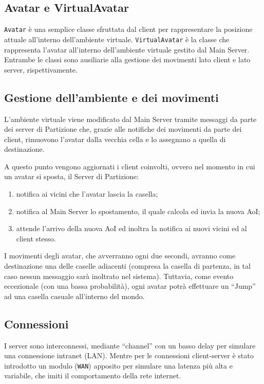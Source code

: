 \documentclass[a4paper, 11pt, oneside]{book}
\theoremstyle{definition}
\theoremstyle{remark}
\begin{document}
\subsection{Avatar e VirtualAvatar}
\texttt{Avatar} è una semplice classe sfruttata dal client per rappresentare
la posizione attuale all'interno dell'ambiente virtuale.
\texttt{VirtualAvatar} è la classe che rappresenta l'avatar all'interno
dell'ambiente virtuale gestito dal Main Server. Entrambe le classi sono
ausiliarie alla gestione dei movimenti lato client e lato server,
rispettivamente.


\subsection{Gestione dell'ambiente e dei movimenti}
L'ambiente virtuale viene modificato dal Main Server tramite messaggi da parte
dei server di Partizione che, grazie alle notifiche dei
movimenti da parte dei client, rimuovono l'avatar dalla vecchia cella
e lo assegnano a quella di destinazione.

A questo punto vengono aggiornati i client coinvolti, ovvero nel momento
in cui un avatar si sposta, il Server di Partizione:
\begin{enumerate}
\item
notifica ai vicini che l'avatar lascia la casella;
\item
notifica al Main Server lo spostamento, il quale calcola ed invia la nuova
AoI;
\item
attende l'arrivo della nuova AoI ed inoltra la notifica ai nuovi vicini ed al
client stesso.
\end{enumerate}

I movimenti degli avatar, che avverranno ogni due secondi, avranno come
destinazione una delle caselle adiacenti (compresa la casella di partenza,
in tal caso nessun messaggio sarà inoltrato nel sistema). Tuttavia,
come evento eccezionale (con una bassa probabilità), ogni avatar potrà
effettuare un ``Jump'' ad una casella casuale all'interno del mondo.

\subsection{Connessioni}
I server sono interconnessi, mediante ``channel'' con un basso delay
per simulare una connessione intranet (LAN). Mentre per le connessioni
client-server è stato introdotto un modulo (\texttt{WAN}) apposito per simulare
una latenza più alta e variabile, che imiti il comportamento della rete
internet.
\end{document}
